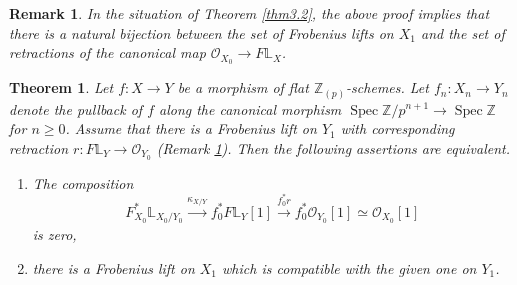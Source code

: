 \documentclass[10pt,a4paper]{amsart}
\newtheorem{theorem}{Theorem}
\newtheorem{remark}{Remark}
\begin{document}
\begin{remark}\label{remA.1}
    In the situation of Theorem \ref{thm3.2}, the above proof implies that there is a natural bijection between the set of Frobenius lifts on $X_1$ and the set of retractions of the canonical map $\mathcal O_{X_0}\to F\mathbb L_X$.
\end{remark}

\begin{theorem}\label{thm3.9}
    Let $f:X\to Y$ be a morphism of flat $\mathbb Z_{(p)}$-schemes. Let $f_n:X_n\to Y_n$ denote the pullback of $f$ along the canonical morphism $\operatorname{Spec}\mathbb Z/p^{n+1}\to \operatorname{Spec}\mathbb Z$ for $n\ge0$. Assume that there is a Frobenius lift on $Y_1$ with corresponding retraction $r:F\mathbb L_Y\to \mathcal O_{Y_0}$ (Remark \ref{remA.1}). Then the following assertions are equivalent.
    \begin{enumerate}
        \item The composition\[F_{X_0}^*\mathbb L_{X_0/Y_0}\xrightarrow[]{\kappa_{X/Y}}f_0^*F\mathbb L_Y[1]\xrightarrow[]{f_0^*r}f_0^*\mathcal O_{Y_0}[1]\simeq \mathcal O_{X_0}[1]\] is zero,
        \item there is a Frobenius lift on $X_1$ which is compatible with the given one on $Y_1$.
    \end{enumerate}
\end{theorem}
\end{document}
